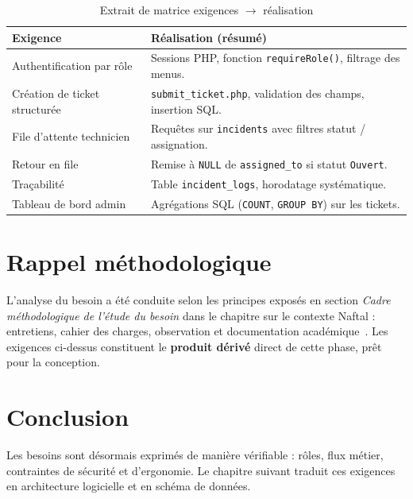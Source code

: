 \begin{table}[H]
\centering
\small
\begin{tabular}{@{}p{5.2cm}p{8.8cm}@{}}
\toprule
\textbf{Exigence} & \textbf{Réalisation (résumé)} \\ \midrule
Authentification par rôle & Sessions PHP, fonction \texttt{requireRole()}, filtrage des menus. \\
Création de ticket structurée & \texttt{submit\_ticket.php}, validation des champs, insertion SQL. \\
File d'attente technicien & Requêtes sur \texttt{incidents} avec filtres statut / assignation. \\
Retour en file & Remise à \texttt{NULL} de \texttt{assigned\_to} si statut \texttt{Ouvert}. \\
Traçabilité & Table \texttt{incident\_logs}, horodatage systématique. \\
Tableau de bord admin & Agrégations SQL (\texttt{COUNT}, \texttt{GROUP BY}) sur les tickets. \\
\bottomrule
\end{tabular}
\caption{Extrait de matrice exigences $\rightarrow$ réalisation}
\label{tab:exigences}
\end{table}

\section{Rappel méthodologique}
L'analyse du besoin a été conduite selon les principes exposés en section \emph{Cadre
méthodologique de l'étude du besoin} dans le chapitre sur le contexte Naftal : entretiens,
cahier des charges, observation et documentation académique~\cite{ssiouani2010,meghari2014}.
Les exigences ci-dessus constituent le \textbf{produit dérivé} direct de cette phase, prêt pour
la conception.

\section{Conclusion}
Les besoins sont désormais exprimés de manière vérifiable : rôles, flux métier, contraintes de
sécurité et d'ergonomie. Le chapitre suivant traduit ces exigences en architecture logicielle et
en schéma de données.
